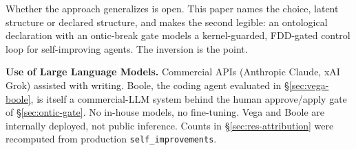 \documentclass[conference,10pt]{IEEEtran}
\newcommand{\TODO}[1]{{\color{red}\textbf{[TODO: #1]}}}
\begin{document}
Whether the approach generalizes is open. This paper names the choice,
latent structure or declared structure, and makes the second legible:
an ontological declaration with an ontic-break gate models a
kernel-guarded, FDD-gated control loop for self-improving agents. The
inversion is the point.

\textbf{Use of Large Language Models.} Commercial APIs (Anthropic Claude,
xAI Grok) assisted with writing. Boole, the coding agent evaluated in
§\ref{sec:vega-boole}, is itself a commercial-LLM system
behind the human approve/apply gate of §\ref{sec:ontic-gate}.
No in-house models, no fine-tuning. Vega and Boole are internally
deployed, not public inference. Counts in
§\ref{sec:res-attribution} were recomputed from production
\texttt{self\_improvements}.



%



\end{document}

